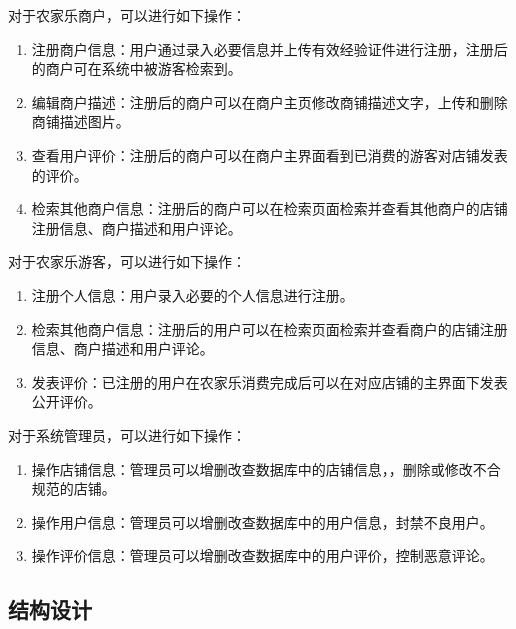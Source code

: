 \documentclass[]{article}
\begin{document}
	对于农家乐商户，可以进行如下操作：
	\begin{enumerate}
		\item 注册商户信息：用户通过录入必要信息并上传有效经验证件进行注册，注册后的商户可在系统中被游客检索到。
		\item 编辑商户描述：注册后的商户可以在商户主页修改商铺描述文字，上传和删除商铺描述图片。
		\item 查看用户评价：注册后的商户可以在商户主界面看到已消费的游客对店铺发表的评价。
		\item 检索其他商户信息：注册后的商户可以在检索页面检索并查看其他商户的店铺注册信息、商户描述和用户评论。
	\end{enumerate}
	
	对于农家乐游客，可以进行如下操作：
	\begin{enumerate}
		\item 注册个人信息：用户录入必要的个人信息进行注册。
		\item 检索其他商户信息：注册后的用户可以在检索页面检索并查看商户的店铺注册信息、商户描述和用户评论。
		\item 发表评价：已注册的用户在农家乐消费完成后可以在对应店铺的主界面下发表公开评价。
	\end{enumerate}
	
	对于系统管理员，可以进行如下操作：
	\begin{enumerate}
		\item 操作店铺信息：管理员可以增删改查数据库中的店铺信息，，删除或修改不合规范的店铺。
		\item 操作用户信息：管理员可以增删改查数据库中的用户信息，封禁不良用户。
		\item 操作评价信息：管理员可以增删改查数据库中的用户评价，控制恶意评论。
	\end{enumerate}
	
	\subsection{结构设计}
\end{document}
